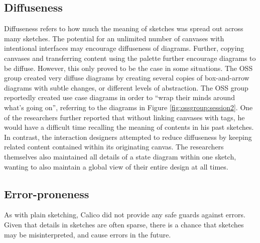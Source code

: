 \subsection{Diffuseness}
Diffuseness refers to how much the meaning of sketches was spread out across many sketches. The potential for an unlimited number of canvases with intentional interfaces may encourage diffuseness of diagrams. Further, copying canvases and transferring content using the palette further encourage diagrams to be diffuse. However, this only proved to be the case in some situations. The OSS group created very diffuse diagrams by creating several copies of box-and-arrow diagrams with subtle changes, or different levels of abstraction. The OSS group reportedly created use case diagrams in order to ``wrap their minds around what's going on'', referring to the diagrams in Figure \ref{fig:ossgroup:session2}. One of the researchers further reported that without linking canvases with tags, he would have a difficult time recalling the meaning of contents in his past sketches. In contrast, the interaction designers attempted to reduce diffuseness by keeping related content contained within its originating canvas. The researchers themselves also maintained all details of a state diagram within one sketch, wanting to also maintain a global view of their entire design at all times.

%

\subsection{Error-proneness}

As with plain sketching, Calico did not provide any safe guards against errors. Given that details in sketches are often sparse, there is a chance that sketches may be misinterpreted, and cause errors in the future.

%


